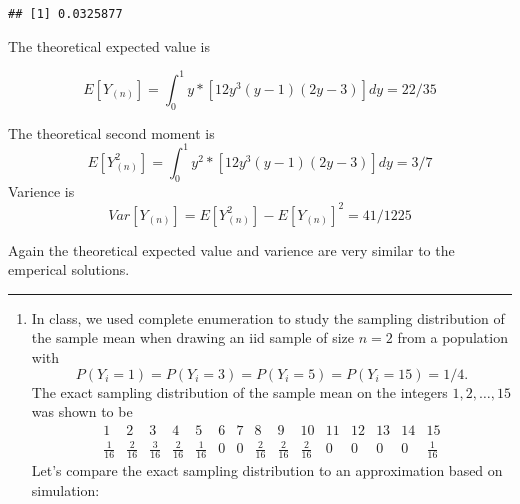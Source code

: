 \documentclass[]{article}
\providecommand{\tightlist}{%
  \setlength{\itemsep}{0pt}\setlength{\parskip}{0pt}}
\begin{document}
\begin{verbatim}
## [1] 0.0325877
\end{verbatim}

The theoretical expected value is

\[
E[Y_{(n)}] = \int_0^1 y*[12y^3(y-1)(2y-3)]dy = 22/35
\]

The theoretical second moment is \[
E[Y_{(n)}^2] = \int_0^1 y^2*[12y^3(y-1)(2y-3)]dy = 3/7
\] Varience is \[
Var[Y_{(n)}] = E[Y_{(n)}^2] - E[Y_{(n)}]^2 = 41/1225
\]

Again the theoretical expected value and varience are very similar to
the emperical solutions.

\begin{center}\rule{0.5\linewidth}{\linethickness}\end{center}

\begin{enumerate}
\def\labelenumi{\arabic{enumi}.}
\setcounter{enumi}{4}
\tightlist
\item
  In class, we used complete enumeration to study the sampling
  distribution of the sample mean when drawing an iid sample of size
  \(n=2\) from a population with \[
  P(Y_i=1)=P(Y_i=3)=P(Y_i=5)=P(Y_i=15)=1/4.
  \] The exact sampling distribution of the sample mean on the integers
  \(1, 2, \ldots, 15\) was shown to be \[
  \begin{array}{c|c|c|c|c|c|c|c|c|c|c|c|c|c|c}
  1 & 2 & 3 & 4 & 5 & 6 & 7 & 8 & 9 & 10 & 11 & 12 & 13& 14 & 15\\\hline
  \frac{1}{16}& \frac{2}{16}&\frac{3}{16}& \frac{2}{16}&\frac{1}{16}&0 & 0 & \frac{2}{16}&\frac{2}{16}& \frac{2}{16}&0 & 0 & 0 & 0 & \frac{1}{16}
  \end{array}
  \] Let's compare the exact sampling distribution to an approximation
  based on simulation:
\end{enumerate}
\end{document}
